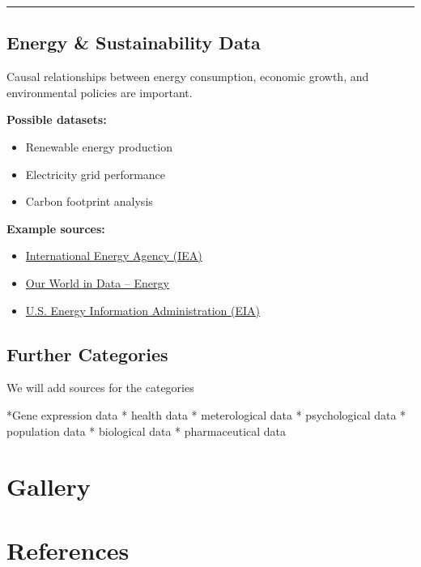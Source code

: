 \documentclass[
  letterpaper,
  DIV=11,
  numbers=noendperiod]{scrreprt}
\newlength{\cslhangindent}
\newenvironment{CSLReferences}[2] %
 {\begin{list}{}{%
  \setlength{\itemindent}{0pt}
  \setlength{\leftmargin}{0pt}
  \setlength{\parsep}{0pt}
  \ifodd #1
   \setlength{\leftmargin}{\cslhangindent}
   \setlength{\itemindent}{-1\cslhangindent}
  \fi
  \setlength{\itemsep}{#2\baselineskip}}}
 {\end{list}}
\begin{document}
\begin{center}\rule{0.5\linewidth}{0.5pt}\end{center}

\section{\texorpdfstring{\textbf{Energy \& Sustainability
Data}}{Energy \& Sustainability Data}}\label{energy-sustainability-data}

Causal relationships between energy consumption, economic growth, and
environmental policies are important.

\textbf{Possible datasets:}

\begin{itemize}
\item
  Renewable energy production
\item
  Electricity grid performance
\item
  Carbon footprint analysis
\end{itemize}

\textbf{Example sources:}

\begin{itemize}
\item
  \href{https://www.iea.org/data-and-statistics}{International Energy
  Agency (IEA)}
\item
  \href{https://ourworldindata.org/energy}{Our World in Data -- Energy}
\item
  \href{https://www.eia.gov/}{U.S. Energy Information Administration
  (EIA)}
\end{itemize}

\section{Further Categories}\label{further-categories}

We will add sources for the categories

*Gene expression data * health data * meterological data * psychological
data * population data * biological data * pharmaceutical data


\chapter{Gallery}\label{gallery}


\chapter*{References}\label{references}


\label{refs}
\begin{CSLReferences}{0}{1}
\end{CSLReferences}
\end{document}
